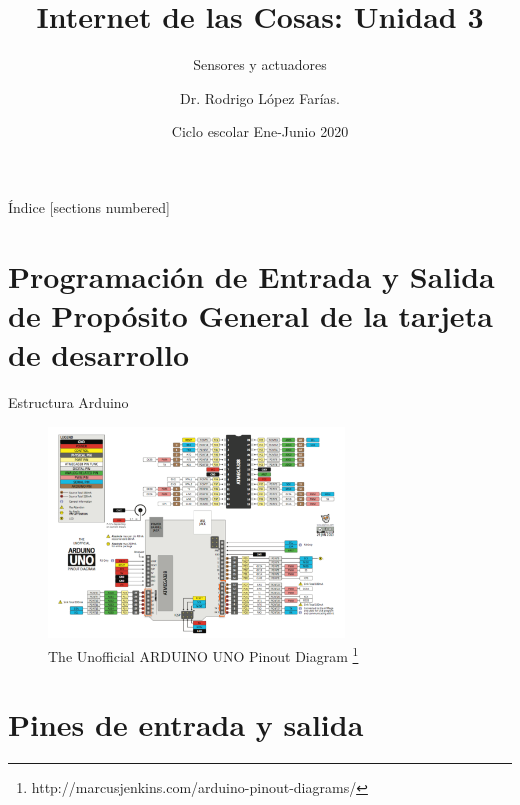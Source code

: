 \documentclass{beamer}
\title{Internet de las Cosas:  Unidad 3}
\subtitle{Sensores y actuadores}
\author{Dr. Rodrigo López Farías. \\}
\institute{Instituto Tecnológico de Querétaro \\ Ingeniería en Sistemas Computacionales}
\date{Ciclo escolar Ene-Junio 2020}
\theoremstyle{definition}
\begin{document}
\frame{\maketitle}


\begin{frame}{Índice}
  [sections numbered]
  \tableofcontents[hideallsubsections]
\end{frame}





\section{Programación de Entrada y Salida de Propósito General de la tarjeta de desarrollo}

\begin{frame}{Estructura Arduino}

\begin{figure}
\centering
\includegraphics[width=0.7\textwidth]{figures/arduinounoref.png}
\caption{The Unofficial ARDUINO UNO Pinout Diagram \footnote{http://marcusjenkins.com/arduino-pinout-diagrams/} }
\end{figure}

\end{frame}


\section{Pines de entrada y salida}
\end{document}
